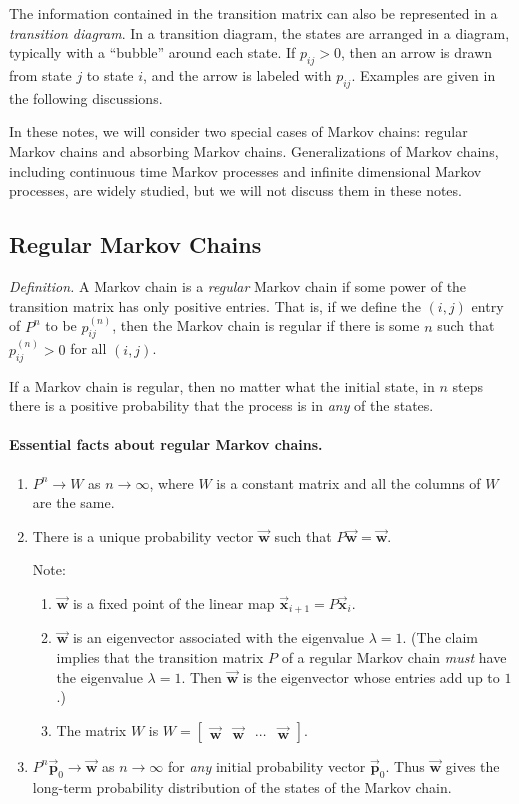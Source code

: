 \documentclass{book}
\newcommand{\BP}{\vec{\textbf{p}}}
\newcommand{\BW}{\vec{\textbf{w}}}
\newcommand{\BX}{\vec{\textbf{x}}}
\begin{document}
The information contained in the transition matrix
can also be represented in a \emph{transition diagram}.
In a transition diagram, the states are arranged
in a diagram, typically with a ``bubble''
around each state.
If $p_{ij} > 0$, then an
arrow is drawn from state $j$ to state $i$, and the
arrow is labeled with $p_{ij}$.  Examples are given
in the following discussions.

In these notes, we will consider two special cases
of Markov chains: regular Markov chains and absorbing
Markov chains.
Generalizations of Markov chains, including
continuous time Markov processes and infinite
dimensional Markov processes, are widely studied,
but we will not discuss them in these notes.
%
%
\subsection*{Regular Markov Chains}

\noindent
\emph{Definition.} A Markov chain is a \emph{regular}
Markov chain if some power of the transition
matrix has only positive entries.
That is, if we define the $(i,j)$ entry of $P^n$
to be $p_{ij}^{(n)}$, then the Markov chain is
regular if there is some $n$ such that
$p_{ij}^{(n)}> 0$ for all $(i,j)$.

\medskip
If a Markov chain is regular, then no matter what the
initial state, in $n$ steps there is a positive
probability that the process is in \emph{any} of the states.

\paragraph{Essential facts about regular Markov chains.}
\begin{enumerate}
\item
$P^n\rightarrow W$ as $n\rightarrow\infty$, where
$W$ is a constant matrix and all the columns of
$W$ are the same.
\item There is a unique probability vector
$\BW$ such that $P\BW = \BW$.

Note:
\begin{enumerate}
\item $\BW$ is a fixed point of the linear map $\BX_{i+1} = P\BX_i$.
\item $\BW$ is an eigenvector associated with the eigenvalue $\lambda=1$.
(The claim implies that the transition matrix $P$ of a regular
Markov chain \emph{must} have the eigenvalue $\lambda=1$.
Then $\BW$ is the eigenvector whose entries add up to $1$.)
\item The matrix $W$ is $W = \begin{bmatrix} \BW & \BW & \cdots & \BW\end{bmatrix}$.
\end{enumerate}
\item $P^n\BP_0 \rightarrow \BW$ as $n\rightarrow\infty$ for \emph{any}
initial probability vector $\BP_0$.
Thus $\BW$ gives the long-term probability distribution of the
states of the Markov chain.
\end{enumerate}
\end{document}
